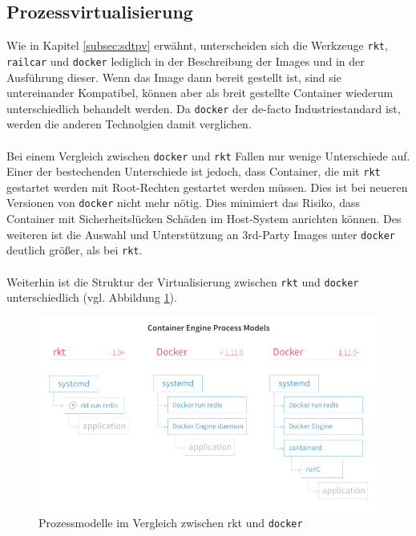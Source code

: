 \documentclass[a4paper]{article}
\begin{document}
\subsection{Prozessvirtualisierung} \label{subsec:tunpv}
Wie in Kapitel \ref{subsec:sdtpv} erwähnt, unterscheiden sich die Werkzeuge 
\texttt{rkt}, \texttt{railcar} und \texttt{docker} lediglich in der 
Beschreibung der Images und in der Ausführung dieser. Wenn das Image dann 
bereit gestellt ist, sind sie untereinander Kompatibel, können aber als breit 
gestellte Container wiederum unterschiedlich behandelt werden. Da 
\texttt{docker} der de-facto Industriestandard ist, werden die anderen 
Technolgien damit verglichen.\\
\\
Bei einem Vergleich zwischen \texttt{docker} und \texttt{rkt} Fallen nur wenige 
Unterschiede auf. Einer der bestechenden Unterschiede ist jedoch, dass 
Container, die mit \texttt{rkt} gestartet werden mit Root-Rechten gestartet 
werden müssen. Dies ist bei neueren Versionen von \texttt{docker} nicht mehr 
nötig. Dies minimiert das Risiko, dass Container mit Sicherheitslücken Schäden 
im Host-System anrichten können. Des weiteren ist die Auswahl und Unterstützung 
an 3rd-Party Images unter \texttt{docker} deutlich größer, als bei 
\texttt{rkt}.\cite{rktvsdocker}\\
\\
Weiterhin ist die Struktur der Virtualisierung zwischen \texttt{rkt} und 
\texttt{docker} unterschiedlich (vgl. Abbildung \ref{fig:rkt_vs_docker}).
\begin{figure}[htp]
	\centering
	\includegraphics[scale=0.5]{img/rkt-vs-docker-process-model.png}
	\caption[Prozessmodelle im Vergleich zwischen rkt und Docker 
	\cite{imgrktvsdocker}]{Prozessmodelle im Vergleich zwischen rkt und 
		\texttt{docker} \cite{imgrktvsdocker}}
	\label{fig:rkt_vs_docker}
\end{figure}
\end{document}
